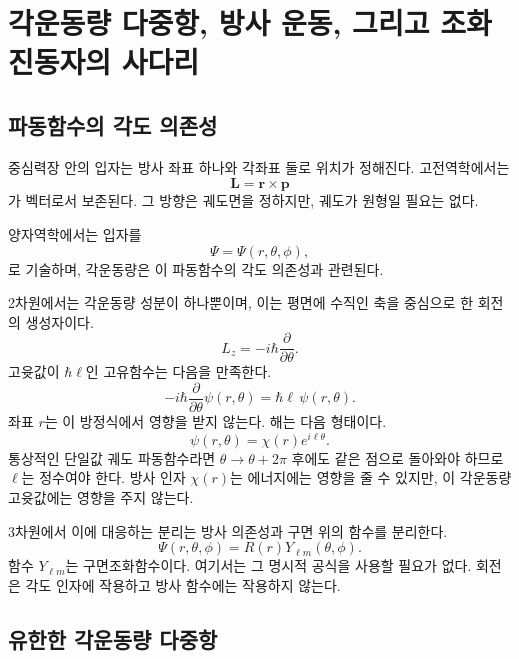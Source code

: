 \chapter{각운동량 다중항, 방사 운동, 그리고 조화진동자의 사다리}

\section{파동함수의 각도 의존성}

중심력장 안의 입자는 방사 좌표 하나와 각좌표 둘로 위치가 정해진다. 고전역학에서는
\begin{equation}
\mathbf L=\mathbf r\times\mathbf p
\end{equation}
가 벡터로서 보존된다. 그 방향은 궤도면을 정하지만, 궤도가 원형일 필요는 없다.

양자역학에서는 입자를
\begin{equation}
\Psi=\Psi(r,\theta,\phi),
\end{equation}
로 기술하며, 각운동량은 이 파동함수의 각도 의존성과 관련된다.

2차원에서는 각운동량 성분이 하나뿐이며, 이는 평면에 수직인 축을 중심으로 한 회전의 생성자이다.
\begin{equation}
L_z=-i\hbar\frac{\partial}{\partial\theta}.
\end{equation}
고윳값이 \(\hbar\ell\)인 고유함수는 다음을 만족한다.
\begin{equation}
-i\hbar\frac{\partial}{\partial\theta}\psi(r,\theta)
=\hbar\ell\,\psi(r,\theta).
\end{equation}
좌표 \(r\)는 이 방정식에서 영향을 받지 않는다. 해는 다음 형태이다.
\begin{equation}
\psi(r,\theta)=\chi(r)e^{i\ell\theta}.
\end{equation}
통상적인 단일값 궤도 파동함수라면 \(\theta\to\theta+2\pi\) 후에도 같은 점으로 돌아와야 하므로 \(\ell\)는 정수여야 한다. 방사 인자 \(\chi(r)\)는 에너지에는 영향을 줄 수 있지만, 이 각운동량 고윳값에는 영향을 주지 않는다.

3차원에서 이에 대응하는 분리는 방사 의존성과 구면 위의 함수를 분리한다.
\begin{equation}
\Psi(r,\theta,\phi)=R(r)Y_{\ell m}(\theta,\phi).
\end{equation}
함수 \(Y_{\ell m}\)는 구면조화함수이다. 여기서는 그 명시적 공식을 사용할 필요가 없다. 회전은 각도 인자에 작용하고 방사 함수에는 작용하지 않는다.

\section{유한한 각운동량 다중항}

